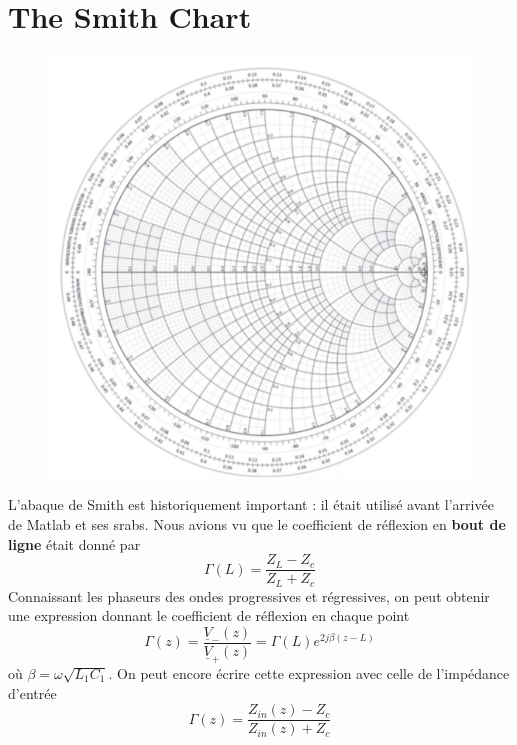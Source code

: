 \section{The Smith Chart}
	\begin{figure}
	\vspace{-5mm}
	\includegraphics[scale=0.25]{ch2/image9.png}
	\end{figure}
L'abaque de Smith est historiquement important : il était utilisé avant l'arrivée de Matlab 
et ses srabs. Nous avions vu que le coefficient de réflexion en \textbf{bout de ligne} était 
donné par
\begin{equation}
\Gamma(L) = \dfrac{Z_L-Z_c}{Z_L+Z_c}
\end{equation}
Connaissant les phaseurs des ondes progressives et régressives, on peut obtenir une expression 
donnant le coefficient de réflexion en chaque point
\begin{equation}
\Gamma(z) = \dfrac{\underline{V}_-(z)}{\underline{V}_+(z)}=\Gamma(L)e^{2j\beta(z-L)} 
\end{equation}
où $\beta = \omega\sqrt{L_1C_1}$. On peut encore écrire cette expression avec celle de l'impédance 
d'entrée
\begin{equation}
\Gamma(z) = \dfrac{Z_{in}(z)-Z_c}{Z_{in}(z)+Z_c}
\end{equation}

